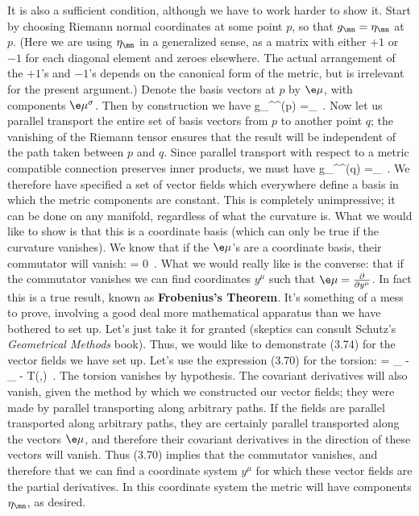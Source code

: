 \documentclass[12pt]{article}
\begin{document}
It is also a sufficient condition, although we have to work harder to
show it.  Start by choosing Riemann normal coordinates at some point
$p$, so that $g_\mn = \eta_\mn$ at $p$.  (Here we are using $\eta_\mn$
in a generalized sense, as a matrix with either $+1$ or $-1$ for each
diagonal element and zeroes elsewhere.  The actual arrangement of
the $+1$'s and $-1$'s depends on the canonical form of the metric, but
is irrelevant for the present argument.)  Denote the basis vectors at
$p$ by $\e\mu$, with components $\e\mu^\sigma$.  Then by construction
we have
\be
  g_{\sigma\rho}\e\mu^\sigma \e\nu^\rho (p) =\eta_\mn\ .\label{3.72}
\ee
Now let us parallel transport the entire set of basis vectors from
$p$ to another point $q$; the vanishing of the Riemann tensor ensures
that the result will be independent of the path taken between $p$
and $q$.  Since parallel transport with respect to a metric compatible
connection preserves inner products, we must have
\be
  g_{\sigma\rho}\e\mu^\sigma \e\nu^\rho (q) =\eta_\mn\ .\label{3.73}
\ee
We therefore have specified a set of vector fields which
everywhere define a basis in which the metric components are constant.
This is completely unimpressive; it can be done on any manifold,
regardless of what the curvature is.  What we would like to show
is that this is a coordinate basis (which can only be true
if the curvature vanishes).
We know that if the $\e\mu$'s are a coordinate basis, their
commutator will vanish:
\be
  [\e\mu,\e\nu] = 0\ .\label{3.74}
\ee
What we would really like is the converse: that if the commutator
vanishes we can find coordinates $y^\mu$ such that $\e\mu = {{\partial}
\over{\partial y^\mu}}$.  In fact this is a true result, known as
{\bf Frobenius's Theorem}.  It's something of a mess to prove, involving
a good deal more mathematical apparatus than we have bothered to set
up.  Let's just take it for granted (skeptics can consult Schutz's
{\sl Geometrical Methods} book).  Thus, we would like to demonstrate
(3.74) for the vector fields we have set up.  Let's use the expression
(3.70) for the torsion:
\be
  [\e\mu,\e\nu] = \nabla_{\e\mu} \e\nu - \nabla_{\e\nu}\e\mu
  - T(\e\mu,\e\nu)\ .\label{3.75}
\ee
The torsion vanishes by hypothesis.  The covariant derivatives will
also vanish, given the method by which we constructed our vector fields;
they were made by parallel transporting along arbitrary paths.  If the
fields are parallel transported along arbitrary paths, they are
certainly parallel transported along the vectors $\e\mu$, and therefore
their covariant derivatives in the direction of these vectors will
vanish.  Thus (3.70) implies that the commutator vanishes, and therefore
that we can find a coordinate system $y^\mu$ for which these vector
fields are the partial derivatives.  In this coordinate system the
metric will have components $\eta_\mn$, as desired.
\end{document}
